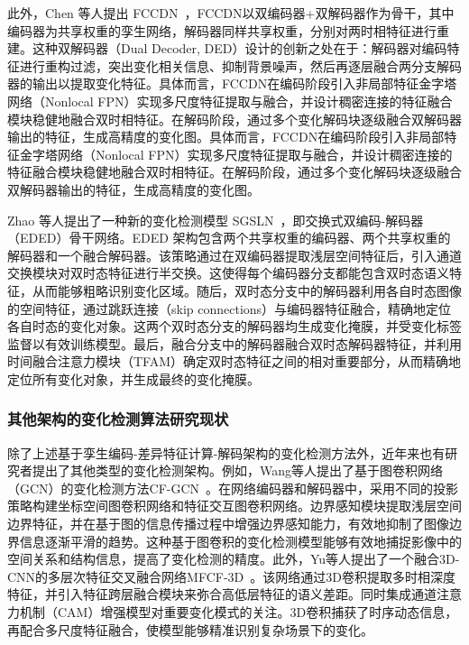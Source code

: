 此外，Chen 等人提出 FCCDN~\cite{Chen2021FCCDNFC}，FCCDN以双编码器+双解码器作为骨干，其中编码器为共享权重的孪生网络，解码器同样共享权重，分别对两时相特征进行重建。这种双解码器（Dual Decoder, DED）设计的创新之处在于：解码器对编码特征进行重构过滤，突出变化相关信息、抑制背景噪声，然后再逐层融合两分支解码器的输出以提取变化特征。具体而言，FCCDN在编码阶段引入非局部特征金字塔网络（Nonlocal FPN）实现多尺度特征提取与融合，并设计稠密连接的特征融合模块稳健地融合双时相特征。在解码阶段，通过多个变化解码块逐级融合双解码器输出的特征，生成高精度的变化图。具体而言，FCCDN在编码阶段引入非局部特征金字塔网络（Nonlocal FPN）实现多尺度特征提取与融合，并设计稠密连接的特征融合模块稳健地融合双时相特征。在解码阶段，通过多个变化解码块逐级融合双解码器输出的特征，生成高精度的变化图。

Zhao 等人提出了一种新的变化检测模型 SGSLN~\cite{zhao_exchanging_2023}，即交换式双编码-解码器（EDED）骨干网络。EDED 架构包含两个共享权重的编码器、两个共享权重的解码器和一个融合解码器。该策略通过在双编码器提取浅层空间特征后，引入通道交换模块对双时态特征进行半交换。这使得每个编码器分支都能包含双时态语义特征，从而能够粗略识别变化区域。随后，双时态分支中的解码器利用各自时态图像的空间特征，通过跳跃连接（skip connections）与编码器特征融合，精确地定位各自时态的变化对象。这两个双时态分支的解码器均生成变化掩膜，并受变化标签监督以有效训练模型。最后，融合分支中的解码器融合双时态解码器特征，并利用时间融合注意力模块（TFAM）确定双时态特征之间的相对重要部分，从而精确地定位所有变化对象，并生成最终的变化掩膜。

\subsubsection{其他架构的变化检测算法研究现状}

除了上述基于孪生编码-差异特征计算-解码架构的变化检测方法外，近年来也有研究者提出了其他类型的变化检测架构。例如，Wang等人提出了基于图卷积网络（GCN）的变化检测方法CF-GCN~\cite{Wang2024CFGCNGC}。在网络编码器和解码器中，采用不同的投影策略构建坐标空间图卷积网络和特征交互图卷积网络。边界感知模块提取浅层空间边界特征，并在基于图的信息传播过程中增强边界感知能力，有效地抑制了图像边界信息逐渐平滑的趋势。这种基于图卷积的变化检测模型能够有效地捕捉影像中的空间关系和结构信息，提高了变化检测的精度。此外，Yu等人提出了一个融合3D-CNN的多层次特征交叉融合网络MFCF-3D~\cite{Yu2024RemoteSI}。该网络通过3D卷积提取多时相深度特征，并引入特征跨层融合模块来弥合高低层特征的语义差距。同时集成通道注意力机制（CAM）增强模型对重要变化模式的关注。3D卷积捕获了时序动态信息，再配合多尺度特征融合，使模型能够精准识别复杂场景下的变化。

